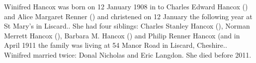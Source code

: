 
Winifred Hancox was born on 12 January 1908 in \cite{BMD1907} to Charles Edward Hancox () and Alice Margaret Renner () \cite{WHancoxBirth} and christened on 12 January the following year at St Mary's in Liscard.\cite{ParishReg}. She had four siblings: Charles Stanley Hancox (), Norman Merrett Hancox (), Barbara M. Hancox () and
Philip Renner Hancox (\p and in April 1911 the family was living at 54 Manor Road in Liscard, Cheshire.\cite{1911Census}.
Winifred married twice: Donal Nicholas and Eric Langdon. She died before 2011.
